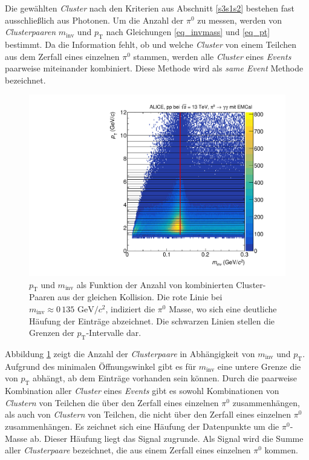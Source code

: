 Die gewählten \textit{Cluster} nach den Kriterien aus Abschnitt \ref{s3s1s2} bestehen fast ausschließlich aus Photonen.
\newline
Um die Anzahl der $\pi^{0}$ zu messen, werden von \textit{Clusterpaaren} $m_\text{inv}$ und $p_\text{T}$ nach Gleichungen \ref{eq_invmass} und \ref{eq_pt} bestimmt.
Da die Information fehlt, ob und welche \textit{Cluster} von einem Teilchen aus dem Zerfall eines einzelnen $\pi^{0}$ stammen, werden alle \textit{Cluster} eines \textit{Events} paarweise miteinander kombiniert.
Diese Methode wird als \textit{same Event} Methode bezeichnet.
\begin{figure}[t!]
\centering
\includegraphics[width=.7\linewidth]{hInvMass_pT_Signal.pdf}
\caption{$p_\text{T}$ und $m_\text{inv}$ als Funktion der Anzahl von kombinierten  Cluster-Paaren aus der gleichen Kollision.
Die rote Linie bei $m_{\text{inv}}\approx0\,135\text{ GeV/}c^{2}$, indiziert die $\pi^{0}$ Masse, wo sich eine deut\-li\-che Häufung der Einträge abzeichnet.
Die schwarzen Linien stellen die Grenzen der $p_{\text{T}}$-Intervalle dar.}
\label{figInvMassPt_a}
\end{figure}
Abbildung \ref{figInvMassPt_a} zeigt die Anzahl der \textit{Clusterpaare} in Abhängigkeit von $m_{\text{inv}}$ und $p_{\text{T}}$.
Aufgrund des minimalen Öffnungswinkel gibt es für $m_\text{inv}$ eine untere Grenze die von $p_\text{T}$ abhängt, ab dem Einträge vorhanden sein können.
Durch die paarweise Kombination aller \textit{Cluster} eines \textit{Events} gibt es sowohl Kombinationen von \textit{Clustern} von Teilchen die über den Zerfall eines einzelnen $\pi^{0}$ zusammenhängen, als auch von \textit{Clustern} von Teilchen, die nicht über den Zerfall eines einzelnen $\pi^{0}$ zusammenhängen.
\newline
Es zeichnet sich eine Häufung der Datenpunkte um die $\pi^{0}$-Masse ab.
Dieser Häufung liegt das Signal zugrunde.
Als Signal wird die Summe aller \textit{Clusterpaare} bezeichnet, die aus einem Zerfall eines einzelnen $\pi^{0}$ kommen.
